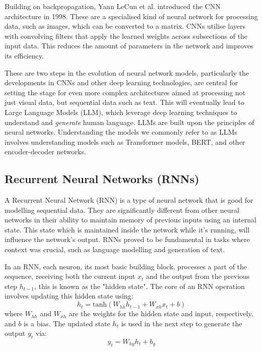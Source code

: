 Building on backpropagation, Yann LeCun et al. \cite{lecun_gradient-based_1998} introduced the \gls{CNN} architecture in 1998. These are a specialised kind of neural network for processing data, such as images, which can be converted to a matrix. \gls{CNN}s utilise layers with convolving filters that apply the learned weights across subsections of the input data. This reduces the amount of parameters in the network and improves its efficiency.


These are two steps in the evolution of neural network models, particularly the developments in \gls{CNN}s and other deep learning technologies, are central for setting the stage for even more complex architectures aimed at processing not just visual data, but sequential data such as text. This will eventually lead to Large Language Models (\gls{LLM}), which leverage deep learning techniques to understand and \textit{generate} human language. \gls{LLM}s are built upon the principles of neural networks. Understanding the models we commonly refer to as \gls{LLM}s involves understanding models such as Transformer models, \gls{BERT}, and other encoder-decoder networks.


\subsection{Recurrent Neural Networks (RNNs)}


A Recurrent Neural Network (\gls{RNN}) is a type of neural network that is good for modelling sequential data. They are significantly different from other neural networks in their ability to maintain memory of previous inputs using an internal state. This state which is maintained inside the network while it’s running, will influence the network’s output. \gls{RNN}s proved to be fundamental in tasks where context was crucial, such as language modelling and generation of text.


In an \gls{RNN}, each neuron, its most basic building block, processes a part of the sequence, receiving both the current input \(x_t\) and the output from the previous step \(h_{t-1}\), this is known as the "hidden state". The core of an \gls{RNN} operation involves updating this hidden state using:
\[
h_t = \text{tanh}(W_{hh} h_{t-1} + W_{xh} x_t + b)
\]
where \(W_{hh}\) and \(W_{xh}\) are the weights for the hidden state and input, respectively, and \(b\) is a bias. The updated state \(h_t\) is used in the next step to generate the output \(y_t\) via:
\[
y_t = W_{hy} h_t + b_y
\]




